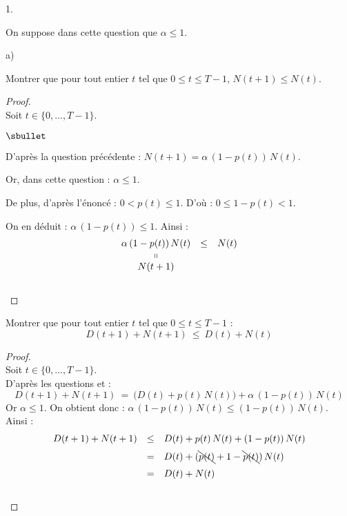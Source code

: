 \begin{noliste}{1.}
  \item On suppose dans cette question que $\alpha \leq 1$.
  \begin{noliste}{a)}
    \setlength{\itemsep}{2mm}
    \item Montrer que pour tout entier $t$ tel que $0 \leq t \leq T-1$,
    $N(t+1) \leq N(t)$.
    
    \begin{proof}~\\
    Soit $t \in \{0, \ldots, T-1\}$.
      \begin{noliste}{$\sbullet$}
	\item D'après la question précédente : $N(t+1) = \alpha \, (1-
	p(t)) \, N(t)$.
	
	\item Or, dans cette question : $\alpha \leq 1$.
	
	\item De plus, d'après l'énoncé : $0 < p(t) \leq 1$. D'où : 
	$0 \leq 1-p(t) <1$.
      \end{noliste}
      On en déduit : $\alpha \, (1-p(t)) \leq 1$. Ainsi :
      \[
        \begin{array}{ccc}
          \alpha \, (1-p(t)) \, N(t) & \leq & N(t)
          \\
          \shortparallel
          \\
          N(t+1)
        \end{array}
      \]
      ~\\[-1cm]
    \end{proof}

    
    \item Montrer que pour tout entier $t$ tel que $0 \leq t \leq T-1$ :
    \[
      D(t+1) + N(t+1) \ \leq \ D(t)+N(t)
    \]
    
    \begin{proof}~\\
      Soit $t\in \{0, \ldots, T-1\}$.\\
      D'après les questions  et  :
      \[
        D(t+1) + N(t+1) \ = \ \big(D(t) + p(t) \, N(t)\big) + 
        \alpha \, (1-p(t)) \, N(t)
      \]
      Or $\alpha \leq 1$. On obtient donc : $ \alpha \, (1-p(t)) \, 
      N(t) \leq (1-p(t)) \, N(t)$.\\
      Ainsi :
      \[
       \begin{array}{rcl}
        D(t+1) + N(t+1) & \leq & D(t) + p(t) \, N(t) + (1-p(t)) \, N(t)
        \\[.2cm]
        &=& D(t) + (\bcancel{p(t)} + 1 - \bcancel{p(t)}) \, N(t)
        \\[.2cm]
        &=& D(t) + N(t)
       \end{array}
      \]
      ~\\[-1cm]
    \end{proof}
    

\end{noliste}
\end{noliste}
